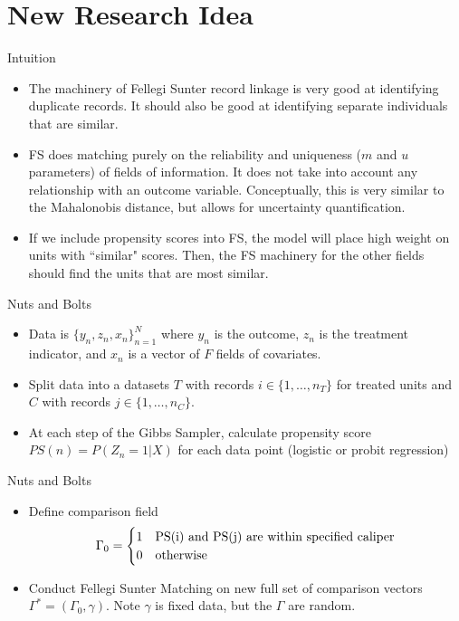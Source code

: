 \documentclass{beamer}
\begin{document}
\section{New Research Idea}

\begin{frame}{Intuition}
	\begin{itemize}
		\item The machinery of Fellegi Sunter record linkage is very good at identifying duplicate records. It should also be good at identifying separate individuals that are similar.
		\item FS does matching purely on the reliability and uniqueness ($m$ and $u$ parameters) of fields of information. It does not take into account any relationship with an outcome variable. Conceptually, this is very similar to the Mahalonobis distance, but allows for uncertainty quantification.
		\item If we include propensity scores into FS, the model will place high weight on units with ``similar" scores. Then, the FS machinery for the other fields should find the units that are most similar. 
	\end{itemize}
\end{frame}

\begin{frame}{Nuts and Bolts}
	\begin{itemize}
		\item Data is $\{y_n, z_n, x_n\}_{n = 1}^N$ where $y_n$ is the outcome, $z_n$ is the treatment indicator, and $x_n$ is a vector of $F$ fields of covariates. 
		\item Split data into a datasets $T$ with records $i \in \{1, \ldots, n_T\}$ for treated units and $C$ with records $j \in \{1, \ldots, n_C\}$. 
		\item At each step of the Gibbs Sampler, calculate propensity score $PS(n) = P(Z_n = 1 | X)$ for each data point (logistic or probit regression)
	\end{itemize}
\end{frame}

\begin{frame}{Nuts and Bolts}
	\begin{itemize}
		\item Define comparison field 
		\begin{align*}
			\Gamma_{0} = \begin{cases}
				1 & $PS(i)$ \text{ and } $PS(j)$ \text{ are within specified caliper} \\
				0 & \text{otherwise} \\
			\end{cases}
		\end{align*} 
		\item Conduct Fellegi Sunter Matching on new full set of comparison vectors $\Gamma^{*} = (\Gamma_0, \gamma)$.
		Note $\gamma$ is fixed data, but the $\Gamma$ are random. 
	\end{itemize}
\end{frame}
\end{document}
